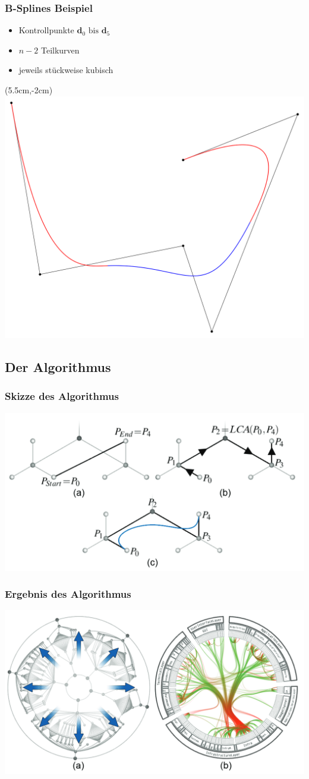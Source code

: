 \documentclass[11pt]{beamer}
\begin{document}
\begin{frame}
\frametitle{B-Splines Beispiel}
\begin{itemize}
\item Kontrollpunkte $\mathbf{d}_0 \text{ bis } \mathbf{d}_5$
\item $n - 2$ Teilkurven
\item jeweils stückweise kubisch
\end{itemize}
\begin{textblock*}{100mm}(5.5cm,-2cm)
\includegraphics[width=0.6\linewidth]{./B-spline_curve.png}
\end{textblock*}
\end{frame}

\subsection{Der Algorithmus}
\begin{frame}
\frametitle{Skizze des Algorithmus}
\includegraphics[scale=0.35]{./Algorithm_Scheme.png}
\end{frame}

\begin{frame}
\frametitle{Ergebnis des Algorithmus}
\includegraphics[scale=0.35]{./Algorithm_Result.png}
\end{frame}
\end{document}
